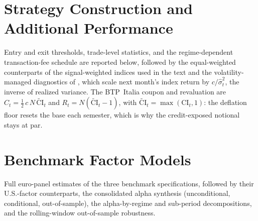 

\section{Strategy Construction and Additional Performance}\label{app:construction}

Entry and exit thresholds, trade-level statistics, and the regime-dependent
transaction-fee schedule are reported below, followed by the equal-weighted
counterparts of the signal-weighted indices used in the text and the
volatility-managed diagnostics of \citet{moreira2017volatility}, which scale
next month's index return by $c/\hat\sigma_t^{2}$, the inverse of realized
variance. The BTP~Italia coupon and revaluation are
$C_t=\tfrac12\,c\,N\,\widetilde{\mathrm{CI}}_t$ and
$R_t=N(\widetilde{\mathrm{CI}}_t-1)$, with
$\widetilde{\mathrm{CI}}_t=\max(\mathrm{CI}_t,1)$: the deflation floor resets
the base each semester, which is why the credit-exposed notional stays at
par.


\clearpage
\section{Benchmark Factor Models}\label{app:benchmarks}

Full euro-panel estimates of the three benchmark specifications, followed by
their U.S.-factor counterparts, the consolidated alpha synthesis
(unconditional, conditional, out-of-sample), the alpha-by-regime and
sub-period decompositions, and the rolling-window out-of-sample robustness.


